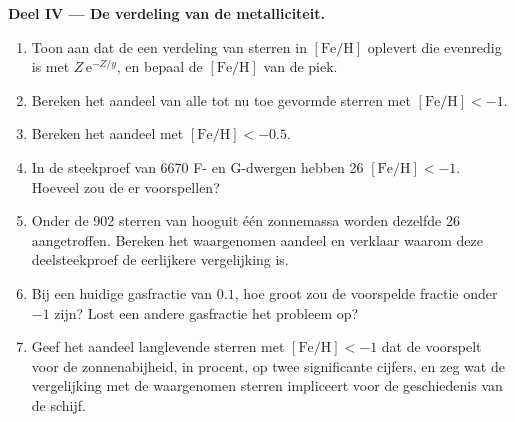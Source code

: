 \begin{problem}
\medskip\noindent\textbf{Deel IV --- De verdeling van de metalliciteit.}
\begin{enumerate}[resume]
\item Toon aan dat de  een verdeling van sterren in
  $[\mathrm{Fe/H}]$ oplevert die evenredig is met $Z\,\mathrm{e}^{-Z/y}$, en bepaal de
  $[\mathrm{Fe/H}]$ van de piek.
\item Bereken het aandeel van alle tot nu toe gevormde sterren met
  $[\mathrm{Fe/H}] < -1$.
\item Bereken het aandeel met $[\mathrm{Fe/H}] < -0.5$.
\item In de steekproef van 6670 F- en G-dwergen hebben 26
  $[\mathrm{Fe/H}] < -1$. Hoeveel zou de  er voorspellen?
\item Onder de 902 sterren van hooguit één zonnemassa worden dezelfde 26
  aangetroffen. Bereken het waargenomen aandeel en verklaar waarom deze deelsteekproef
  de eerlijkere vergelijking is.
\item Bij een huidige gasfractie van $0.1$, hoe groot zou de voorspelde
  fractie onder $-1$ zijn? Lost een andere gasfractie het
  probleem op?
\item Geef het aandeel langlevende sterren met $[\mathrm{Fe/H}] < -1$
  dat de  voorspelt voor de zonnenabijheid, in procent,
  op twee significante cijfers, en zeg wat de vergelijking met de
  waargenomen sterren impliceert voor de geschiedenis van de schijf.
\end{enumerate}
\end{problem}
